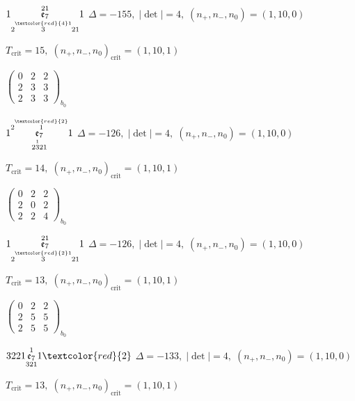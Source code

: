 \documentclass[10pt]{article}
\begin{document}
\smallskip

$1\overset{21}{\underset{2\overset{\textcolor{red}{4}1}{3}21}{\mathfrak{e}_7}}1$ \quad $\Delta=-155,\; |\det|=4,\; (n_+,n_-,n_0)=(1,10,0)$

\hspace{1em}$T_{\text{crit}}=15,\; (n_+,n_-,n_0)_{\text{crit}}=(1,10,1)$

\hspace{2em}$\left(\begin{smallmatrix}0 & 2 & 2 \\ 2 & 3 & 3 \\ 2 & 3 & 3\end{smallmatrix}\right)_{\!b_0}$

$1\overset{2\overset{\textcolor{red}{2}}{1}}{\underset{2\overset{1}{3}21}{\mathfrak{e}_7}}1$ \quad $\Delta=-126,\; |\det|=4,\; (n_+,n_-,n_0)=(1,10,0)$

\hspace{1em}$T_{\text{crit}}=14,\; (n_+,n_-,n_0)_{\text{crit}}=(1,10,1)$

\hspace{2em}$\left(\begin{smallmatrix}0 & 2 & 2 \\ 2 & 0 & 2 \\ 2 & 2 & 4\end{smallmatrix}\right)_{\!b_0}$

$1\overset{21}{\underset{2\overset{\textcolor{red}{2}1}{3}21}{\mathfrak{e}_7}}1$ \quad $\Delta=-126,\; |\det|=4,\; (n_+,n_-,n_0)=(1,10,0)$

\hspace{1em}$T_{\text{crit}}=13,\; (n_+,n_-,n_0)_{\text{crit}}=(1,10,1)$

\hspace{2em}$\left(\begin{smallmatrix}0 & 2 & 2 \\ 2 & 5 & 5 \\ 2 & 5 & 5\end{smallmatrix}\right)_{\!b_0}$

\smallskip

$3221\overset{1}{\underset{321}{\mathfrak{e}_7}}1\textcolor{red}{2}$ \quad $\Delta=-133,\; |\det|=4,\; (n_+,n_-,n_0)=(1,10,0)$

\hspace{1em}$T_{\text{crit}}=13,\; (n_+,n_-,n_0)_{\text{crit}}=(1,10,1)$
\end{document}
